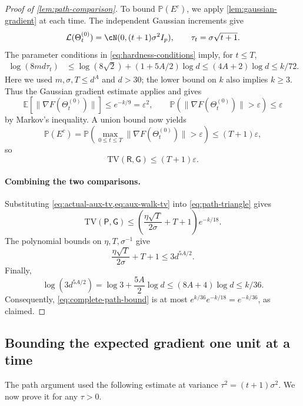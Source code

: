 \documentclass[11pt,twoside]{article}
\newcommand{\E}{\mathbb E}
\renewcommand{\P}{\mathbb P}
\newcommand{\Law}{\mathcal L}
\newcommand{\TV}{\mathrm{TV}}
\theoremstyle{definition}
\theoremstyle{remark}
\begin{document}
\begin{proof}[Proof of \cref{lem:path-comparison}]
To bound $\P(E^c)$, we apply \cref{lem:gaussian-gradient} at each time.
The independent Gaussian increments give
\[
\Law(\Theta_t^{(0)})=\cN(0,(t+1)\sigma^2I_p),
\qquad \tau_t=\sigma\sqrt{t+1}.
\]
The parameter conditions in \cref{eq:hardness-conditions} imply, for $t\le T$,
\begin{align*}
\log(8md\tau_t)
&\le\log(8\sqrt2)+(1+5A/2)\log d
\le(4A+2)\log d
\le k/72.
\end{align*}
Here we used $m,\sigma,T\le d^A$ and $d>30$; the lower bound on $k$ also
implies $k\ge3$. Thus the Gaussian gradient estimate applies and gives
\[
\E[\|\nabla F(\Theta_t^{(0)})\|]\le e^{-k/9}=\varepsilon^2,
\qquad
\P(\|\nabla F(\Theta_t^{(0)})\|>\varepsilon)\le\varepsilon
\]
by Markov's inequality. A union bound now yields
\begin{equation}
\P(E^c)
=\P\!\left(\max_{0\le t\le T}\|\nabla F(\Theta_t^{(0)})\|
>\varepsilon\right)
\le(T+1)\varepsilon,
\label{eq:walk-good-event}
\end{equation}
so
\begin{equation}
\TV(\mathsf R,\mathsf G)\le(T+1)\varepsilon.
\label{eq:aux-walk-tv}
\end{equation}

\paragraph{Combining the two comparisons.}
Substituting \cref{eq:actual-aux-tv,eq:aux-walk-tv} into
\cref{eq:path-triangle} gives
\begin{equation}
\TV(\mathsf P,\mathsf G)
\le\left(\frac{\eta\sqrt T}{2\sigma}+T+1\right)e^{-k/18}.
\label{eq:complete-path-bound}
\end{equation}
The polynomial bounds on $\eta,T,\sigma^{-1}$ give
\[
\frac{\eta\sqrt T}{2\sigma}+T+1\le3d^{5A/2}.
\]
Finally,
\[
\log(3d^{5A/2})
=\log3+\frac{5A}{2}\log d
\le(8A+4)\log d
\le k/36.
\]
Consequently, \cref{eq:complete-path-bound} is at most
$e^{k/36}e^{-k/18}=e^{-k/36}$, as claimed.
\end{proof}

\subsection{Bounding the expected gradient one unit at a time}
\label{sec:gaussian-gradient-proof}

The path argument used the following estimate at variance
$\tau^2=(t+1)\sigma^2$. We now prove it for any $\tau>0$.
\gaussiangradient*
\end{document}
